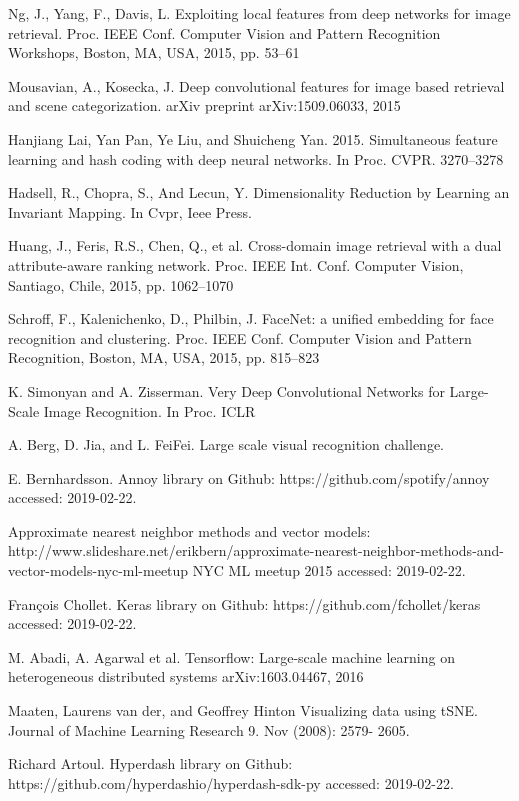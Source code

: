 \documentclass[10pt,twocolumn,letterpaper]{article}
\begin{document}
{\begin{thebibliography}{10}
Ng, J., Yang, F., Davis, L.
\newblock Exploiting local features from deep networks for image retrieval.
\newblock Proc. IEEE Conf. Computer Vision and Pattern Recognition Workshops, Boston, MA, USA, 2015, pp. 53–61

Mousavian, A., Kosecka, J.
\newblock Deep convolutional features for image based retrieval and scene categorization.
\newblock arXiv preprint arXiv:1509.06033, 2015

Hanjiang Lai, Yan Pan, Ye Liu, and Shuicheng Yan. 2015. 
\newblock Simultaneous feature learning and hash coding with deep neural networks. 
\newblock In Proc. CVPR. 3270–3278

Hadsell, R., Chopra, S., And Lecun, Y.
\newblock Dimensionality Reduction by Learning an Invariant Mapping.
\newblock In Cvpr, Ieee Press.

Huang, J., Feris, R.S., Chen, Q., et al.
Cross-domain image retrieval with a dual attribute-aware ranking network.
\newblock Proc. IEEE Int. Conf. Computer Vision, Santiago, Chile, 2015, pp. 1062–1070

Schroff, F., Kalenichenko, D., Philbin, J.
\newblock FaceNet: a unified embedding for face recognition and clustering. \newblock Proc. IEEE Conf. Computer Vision and Pattern Recognition, Boston, MA, USA, 2015, pp. 815–823

K. Simonyan and A. Zisserman. 
\newblock Very Deep Convolutional Networks for Large-Scale Image Recognition. 
\newblock In Proc. ICLR

A. Berg, D. Jia, and L. FeiFei. 
\newblock Large scale visual recognition challenge.

E. Bernhardsson.
\newblock Annoy library on Github: https://github.com/spotify/annoy
\newblock accessed: 2019-02-22.

Approximate nearest neighbor methods and vector models: http://www.slideshare.net/erikbern/approximate-nearest-neighbor-methods-and-vector-models-nyc-ml-meetup
\newblock NYC ML meetup 2015
\newblock accessed: 2019-02-22.

François Chollet.
\newblock Keras library on Github: https://github.com/fchollet/keras
\newblock accessed: 2019-02-22.

M. Abadi, A. Agarwal et al.
\newblock Tensorflow: Large-scale machine learning on heterogeneous distributed systems
\newblock arXiv:1603.04467, 2016

Maaten, Laurens van der, and Geoffrey Hinton
\newblock Visualizing data using tSNE.
\newblock Journal of Machine Learning Research 9. Nov (2008): 2579- 2605.

Richard Artoul.
\newblock Hyperdash library on Github: https://github.com/hyperdashio/hyperdash-sdk-py
\newblock accessed: 2019-02-22.

\end{thebibliography}}
\addtolength{\textheight}{-10cm}
\end{document}
